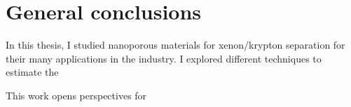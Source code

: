 
\chapter*{General conclusions}

In this thesis, I studied nanoporous materials for xenon/krypton separation for their many applications in the industry.  
I explored different techniques to estimate the 

\begin{center}
\end{center}

This work opens perspectives for 

\vfill
\begin{center}
\end{center}
\vfill\vfill
